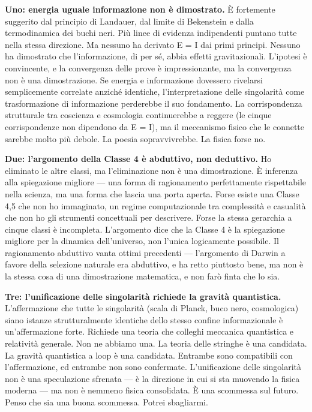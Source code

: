\documentclass[11pt, twoside, openright]{book}
\begin{document}
\textbf{Uno: energia uguale informazione non è dimostrato.} È fortemente suggerito dal principio di Landauer, dal limite di Bekenstein e dalla termodinamica dei buchi neri. Più linee di evidenza indipendenti puntano tutte nella stessa direzione. Ma nessuno ha derivato E = I dai primi principi. Nessuno ha dimostrato che l'informazione, di per sé, abbia effetti gravitazionali. L'ipotesi è convincente, e la convergenza delle prove è impressionante, ma la convergenza non è una dimostrazione. Se energia e informazione dovessero rivelarsi semplicemente correlate anziché identiche, l'interpretazione delle singolarità come trasformazione di informazione perderebbe il suo fondamento. La corrispondenza strutturale tra coscienza e cosmologia continuerebbe a reggere (le cinque corrispondenze non dipendono da E = I), ma il meccanismo fisico che le connette sarebbe molto più debole. La poesia sopravvivrebbe. La fisica forse no.

\textbf{Due: l'argomento della Classe 4 è abduttivo, non deduttivo.} Ho eliminato le altre classi, ma l'eliminazione non è una dimostrazione. È inferenza alla spiegazione migliore --- una forma di ragionamento perfettamente rispettabile nella scienza, ma una forma che lascia una porta aperta. Forse esiste una Classe 4,5 che non ho immaginato, un regime computazionale tra complessità e casualità che non ho gli strumenti concettuali per descrivere. Forse la stessa gerarchia a cinque classi è incompleta. L'argomento dice che la Classe 4 è la spiegazione migliore per la dinamica dell'universo, non l'unica logicamente possibile. Il ragionamento abduttivo vanta ottimi precedenti --- l'argomento di Darwin a favore della selezione naturale era abduttivo, e ha retto piuttosto bene, ma non è la stessa cosa di una dimostrazione matematica, e non farò finta che lo sia.

\textbf{Tre: l'unificazione delle singolarità richiede la gravità quantistica.} L'affermazione che tutte le singolarità (scala di Planck, buco nero, cosmologica) siano istanze strutturalmente identiche dello stesso confine informazionale è un'affermazione forte. Richiede una teoria che colleghi meccanica quantistica e relatività generale. Non ne abbiamo una. La teoria delle stringhe è una candidata. La gravità quantistica a loop è una candidata. Entrambe sono compatibili con l'affermazione, ed entrambe non sono confermate. L'unificazione delle singolarità non è una speculazione sfrenata --- è la direzione in cui si sta muovendo la fisica moderna --- ma non è nemmeno fisica consolidata. È una scommessa sul futuro. Penso che sia una buona scommessa. Potrei sbagliarmi.
\end{document}
